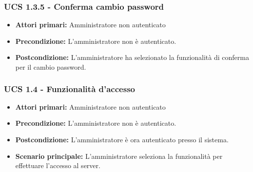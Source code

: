 \subsubsection{UCS 1.3.5 - Conferma cambio password}%
\begin{itemize}
\item \textbf{Attori primari:} Amministratore non autenticato
\item \textbf{Precondizione:} L'amministratore non è autenticato.
\item \textbf{Postcondizione:} L'amministratore ha selezionato la funzionalità di conferma per il cambio password.
\end{itemize}

\subsubsection{UCS 1.4 - Funzionalità d'accesso}%
\begin{itemize}
\item \textbf{Attori primari:} Amministratore non autenticato
\item \textbf{Precondizione:} L'amministratore non è autenticato.
\item \textbf{Postcondizione:} L'amministratore è ora autenticato presso il sistema.
\item \textbf{Scenario principale:} L'amministratore seleziona la funzionalità per effettuare l'accesso al server.
\end{itemize}
